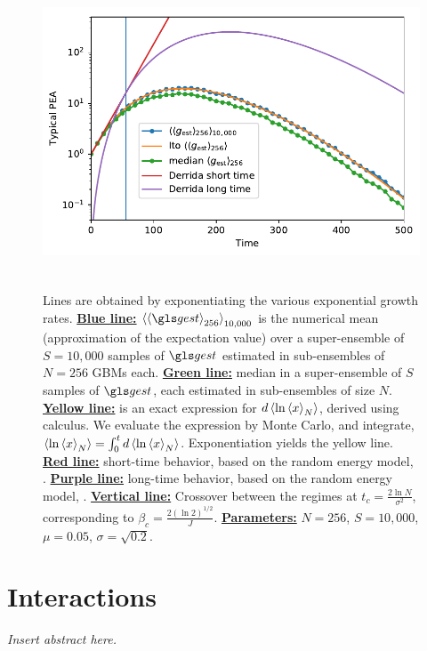 \begin{figure}
\centering
\includegraphics[height=9.3cm]{./chapter_3/figs/PEA.pdf}
\caption{Lines are obtained by exponentiating the various exponential 
growth rates. {\bf \underline{Blue line:}} $\ave{\ave{\gest}_{256}}_{10,000}$ is the numerical mean 
(approximation of the expectation value) 
over a super-ensemble of $S=10,000$ samples of $\gest$ estimated in sub-ensembles of $N=256$ GBMs each. 
{\bf \underline{Green line:}} median in a super-ensemble of $S$ samples of $\gest$, each estimated in sub-ensembles of size $N$. 
{\bf \underline{Yellow line:}}  is an exact expression for $d\left\langle\ln\left\langle x \right\rangle_N \right\rangle$, derived using \Ito calculus. We evaluate the expression by Monte Carlo, and integrate, $\left\langle\ln\left\langle x \right\rangle_N \right\rangle=\int_{0}^{t} d\left\langle\ln\left\langle x \right\rangle_N \right\rangle$. Exponentiation yields the yellow line. 
{\bf \underline{Red line:}} short-time behavior, based on the random energy model, .
{\bf \underline{Purple line:}} long-time behavior, based on the random energy model, . {\bf \underline{Vertical line:}} Crossover between the regimes at $t_c=\frac{2\ln N}{\sigma^2}$, corresponding to $\beta_c=\frac{2(\ln 2)^{1/2}}{J}$.
{\bf \underline{Parameters:}} $N=256$, $S=10,000$, $\mu=0.05$, $\sigma=\sqrt{0.2}$.}
\end{figure}
\FloatBarrier

\newpage


\section{Interactions}
{\it
Insert abstract here.
}
\newpage


